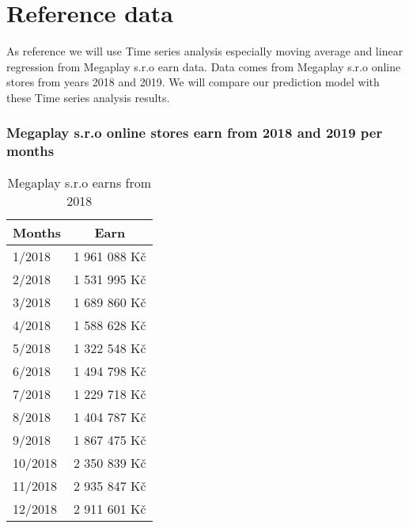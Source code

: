 
\chapter{Reference data} \label{reference_data}

As reference we will use Time series analysis especially moving average and linear regression from Megaplay s.r.o earn data. Data comes from Megaplay s.r.o online stores from years 2018 and 2019.
We will compare  our prediction model with these Time series analysis results.
\subsection{Megaplay s.r.o online stores earn from 2018 and 2019 per months}
\begin{table}[h!]
    \begin{center}
        \begin{tabular}{ | l | c | }
            \hline
            {\textbf{Months}} & \textbf{Earn} \\
            \hline
            1/2018 & 1 961 088 Kč \\
            \hline
            2/2018 & 1 531 995 Kč \\
            \hline
            3/2018 & 1 689 860 Kč \\
            \hline
            4/2018 & 1 588 628 Kč \\
            \hline
            5/2018 & 1 322 548 Kč \\
            \hline
            6/2018 & 1 494 798 Kč \\
            \hline
            7/2018 & 1 229 718 Kč \\
            \hline
            8/2018 & 1 404 787 Kč \\
            \hline
            9/2018 & 1 867 475 Kč \\
            \hline
            10/2018 & 2 350 839 Kč \\
            \hline
            11/2018 & 2 935 847 Kč \\
            \hline
            12/2018 & 2 911 601 Kč \\
            \hline
        \end{tabular}
    \end{center}
    \caption{Megaplay s.r.o earns from 2018}
    \label{Megaplay s.r.o earns from 2018}
\end{table}
\newpage
